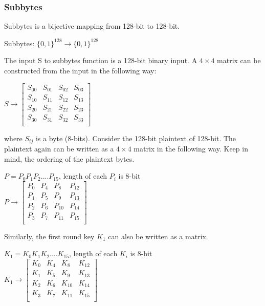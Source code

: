 \documentclass[11pt]{article}
\begin{document}
\subsubsection{Subbytes}
Subbytes is a bijective mapping from 128-bit to 128-bit.
\begin{center}
    Subbytes: $\{0, 1\}^{128} \rightarrow \{0, 1\}^{128}$
\end{center}
The input S to subbytes function is a 128-bit binary input. A $4 \times 4$ matrix can be constructed from the input in the following way:
\begin{center}
    $S \rightarrow  
        \begin{bmatrix}
        S_{00} & S_{01} & S_{02} & S_{03}\\
        S_{10} & S_{11} & S_{12} & S_{13}\\
        S_{20} & S_{21} & S_{22} & S_{23}\\
        S_{30} & S_{31} & S_{32} & S_{33}\\
        \end{bmatrix}$
\end{center}
where $S_{ij}$ is a byte (8-bits). Consider the 128-bit plaintext of 128-bit. The plaintext again can be written as a $4 \times 4$ matrix in the following way. Keep in mind, the ordering of the plaintext bytes.
\begin{center}
    $P = P_0P_1P_2....P_{15}$, length of each $P_i$ is 8-bit\\
    \vspace{1mm}
    $P \rightarrow  
        \begin{bmatrix}
        P_0 & P_4 & P_8 & P_{12}\\
        P_1 & P_5 & P_9 & P_{13}\\
        P_2 & P_6 & P_{10} & P_{14}\\
        P_3 & P_7 & P_{11} & P_{15}\\
        \end{bmatrix}$
\end{center}
Similarly, the first round key $K_1$ can also be written as a matrix.
\begin{center}
    $K_1 = K_0K_1K_2....K_{15}$, length of each $K_i$ is 8-bit\\
    \vspace{1mm}
    $K_1 \rightarrow  
        \begin{bmatrix}
        K_0 & K_4 & K_8 & K_{12}\\
        K_1 & K_5 & K_9 & K_{13}\\
        K_2 & K_6 & K_{10} & K_{14}\\
        K_3 & K_7 & K_{11} & K_{15}\\
        \end{bmatrix}$
\end{center}
\end{document}
